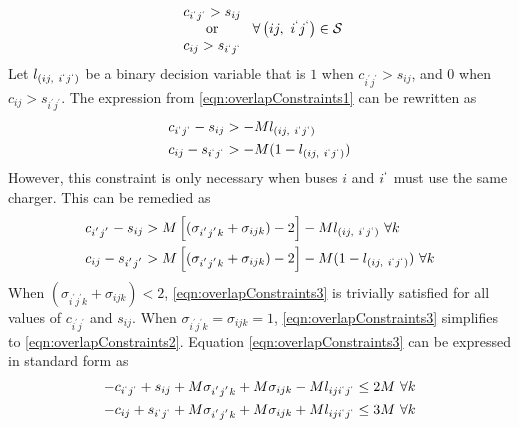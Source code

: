\begin{equation}\label{eqn:overlapConstraints1}
	\begin{array}{c}
		c_{i^{`}j^{`}} > s_{ij} \\
		\text{or} \\
		c_{ij} > s_{i^{`}j^{`}} 
	\end{array} \ \forall \left ( ij, \ i^{`}j^{`}\right ) \in \mathcal{S}
\end{equation}
	Let $l_{\left( ij, \ i^{`}j^{`}\right )}$ be a binary decision variable that is $1$ when $c_{i^{'}j^{'}} > s_{ij}$, and $0$ when $c_{ij} > s_{i^{'}j^{'}}$. The expression from \eqref{eqn:overlapConstraints1} can be rewritten as
	\begin{equation} \label{eqn:overlapConstraints2}\begin{aligned}
	c_{i^{`}j^{`}} - s_{ij}  &> -Ml_{\left( ij, \ i^{`}j^{`}\right )} \\
	c_{ij}-s_{i^{`}j^{`}} &>  -M(1 - l_{\left( ij, \ i^{`}j^{`}\right )}) \\
\end{aligned}\end{equation}
	However, this constraint is only necessary when buses $i$ and $i^{`}$ must use the same charger. This can be remedied as
\begin{equation}\label{eqn:overlapConstraints3}\begin{aligned}
	c_{i^{'}j^{'}} - s_{ij} &> M\left[(\sigma_{i^{'}j^{'}k} + \sigma_{ijk}) - 2\right] - Ml_{\left( ij, \ i^{`}j^{`}\right )} \ \forall k \\
	c_{ij} - s_{i^{'}j^{'}} &> M\left[(\sigma_{i^{'}j^{'}k} + \sigma_{ijk}) - 2\right] - M(1 - l_{\left( ij, \ i^{`}j^{`}\right )})\ \forall k \\
\end{aligned}\end{equation}
When $(\sigma_{i^{'}j^{'}k} + \sigma_{ijk}) < 2$, \eqref{eqn:overlapConstraints3} is trivially satisfied for all values of $c_{i^{'}j^{'}}$ and $s_{ij}$. When $\sigma_{i^{'}j^{'}k} = \sigma_{ijk} = 1$, \eqref{eqn:overlapConstraints3} simplifies to \eqref{eqn:overlapConstraints2}. Equation \eqref{eqn:overlapConstraints3} can be expressed in standard form as 
	\begin{equation}\label{eqn:overlapConstraints3}\begin{aligned}
		-c_{i^{`}j^{`}} + s_{ij} + M\sigma_{i^{'}j^{'}k} + M\sigma_{ijk} - Ml_{iji^{`}j^{`}}&\le 2M  \ \forall k\\
		-c_{ij} + s_{i^{`}j^{`}} + M\sigma_{i^{'}j^{'}k} + M\sigma_{ijk} + Ml_{iji^{`}j^{`}}&\le 3M  \ \forall k\\
	\end{aligned}\end{equation}
